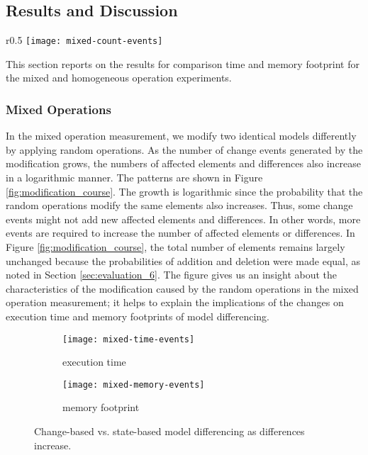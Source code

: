 \subsection{Results and Discussion}
\label{sec:results_and_discussion}

\begin{wrapfigure}[9]{r}{0.5\textwidth}
  \vspace{-20pt}
  \texttt{[image: mixed-count-events]}
  \caption{total elements, affected elements, and diffs}
  \label{fig:modification_course}
\end{wrapfigure}

This section reports on the results for comparison time and memory footprint for the mixed and homogeneous operation experiments.

\vspace{-5pt}
\subsubsection{Mixed Operations}
\label{sec:mixed-operation}
In the mixed operation measurement, we modify two identical models differently by applying random operations. As the number of change events generated by the modification grows, the numbers of affected elements and differences also increase in a logarithmic manner. The patterns are shown in Figure \ref{fig:modification_course}. The growth is logarithmic since the probability that the random operations modify the same elements also increases. Thus, some change events might not add new affected elements and differences. In other words, more events are required to increase the number of affected elements or differences. In Figure \ref{fig:modification_course}, the total number of elements remains largely unchanged because the probabilities of addition and deletion were made equal, as noted in Section \ref{sec:evaluation_6}. The figure gives us an insight about the characteristics of the modification caused by the random operations in the mixed operation measurement; it helps to explain the implications of the changes on execution time and memory footprints of model differencing.

\begin{figure}[ht]
  \begin{subfigure}[t]{0.495\linewidth}
    \texttt{[image: mixed-time-events]}
    \caption{execution time}
    \label{fig:time_diffs}
  \end{subfigure}
  \begin{subfigure}[t]{0.495\linewidth}
    \texttt{[image: mixed-memory-events]}
    \caption{memory footprint}
    \label{fig:memory_diffs}
  \end{subfigure}
  \caption{Change-based vs. state-based model differencing as differences increase.}
  \label{fig:change_vs_state}
\end{figure}

